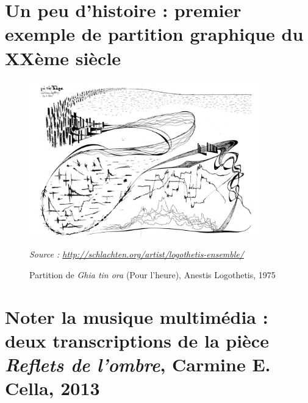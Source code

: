 \section{Un peu d'histoire : premier exemple de partition graphique du XXème siècle}
\label{sec:exempleAnestisLogothetis}
\begin{figure}[!htbp]
	\centering
	\includegraphics[keepaspectratio=true, width=0.9\textwidth]{Annexes/i/exempleAnestisLogothetis.jpg}
	\caption{Partition de \textit{Ghia tin ora} (Pour l'heure), Anestis Logothetis, 1975}
	\medskip
	\small
	\textit{Source : \url{http://schlachten.org/artist/logothetis-ensemble/}} 	
	\label{fig:exempleAnestisLogothetis}
\end{figure}




\section{Noter la musique multimédia : deux transcriptions de la pièce \textit{Reflets de l'ombre}, Carmine E. Cella, 2013}
\label{sec:refletsDeLOmbre}

